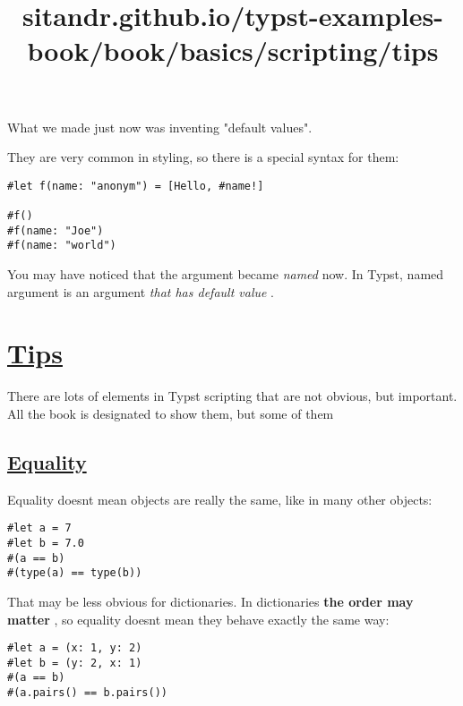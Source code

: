 What we made just now was inventing "default values".

They are very common in styling, so there is a special syntax for them:

\begin{verbatim}
#let f(name: "anonym") = [Hello, #name!]

#f()
#f(name: "Joe")
#f(name: "world")
\end{verbatim}

\pandocbounded{}

You may have noticed that the argument became \emph{named} now. In
Typst, named argument is an argument \emph{that has default value} .


\title{sitandr.github.io/typst-examples-book/book/basics/scripting/tips}

\section{\texorpdfstring{\hyperref[tips]{Tips}}{Tips}}\label{tips}

There are lots of elements in Typst scripting that are not obvious, but
important. All the book is designated to show them, but some of them

\subsection{\texorpdfstring{\hyperref[equality]{Equality}}{Equality}}\label{equality}

Equality doesn\textquotesingle t mean objects are really the same, like
in many other objects:

\begin{verbatim}
#let a = 7
#let b = 7.0
#(a == b)
#(type(a) == type(b))
\end{verbatim}

\pandocbounded{}

That may be less obvious for dictionaries. In dictionaries \textbf{the
order may matter} , so equality doesn\textquotesingle t mean they behave
exactly the same way:

\begin{verbatim}
#let a = (x: 1, y: 2)
#let b = (y: 2, x: 1)
#(a == b)
#(a.pairs() == b.pairs())
\end{verbatim}

